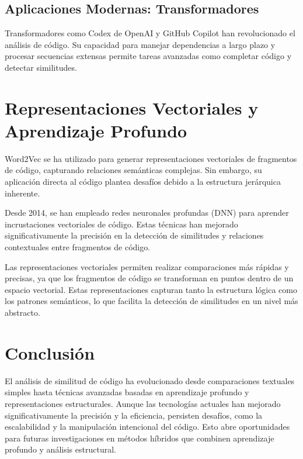 \subsection{Aplicaciones Modernas: Transformadores}
Transformadores como Codex de OpenAI y GitHub Copilot \cite{vaswani2017attention} han revolucionado el análisis de código. Su capacidad para manejar dependencias a largo plazo y procesar secuencias extensas permite tareas avanzadas como completar código y detectar similitudes.

\section{Representaciones Vectoriales y Aprendizaje Profundo}

Word2Vec se ha utilizado para generar representaciones vectoriales de fragmentos de código, capturando relaciones semánticas complejas. Sin embargo, su aplicación directa al código plantea desafíos debido a la estructura jerárquica inherente.

Desde 2014, se han empleado redes neuronales profundas (DNN) para aprender incrustaciones vectoriales de código. Estas técnicas han mejorado significativamente la precisión en la detección de similitudes y relaciones contextuales entre fragmentos de código.

Las representaciones vectoriales permiten realizar comparaciones más rápidas y precisas, ya que los fragmentos de código se transforman en puntos dentro de un espacio vectorial. Estas representaciones capturan tanto la estructura lógica como los patrones semánticos, lo que facilita la detección de similitudes en un nivel más abstracto.

\section{Conclusión}
El análisis de similitud de código ha evolucionado desde comparaciones textuales simples hasta técnicas avanzadas basadas en aprendizaje profundo y representaciones estructurales. Aunque las tecnologías actuales han mejorado significativamente la precisión y la eficiencia, persisten desafíos, como la escalabilidad y la manipulación intencional del código. Esto abre oportunidades para futuras investigaciones en métodos híbridos que combinen aprendizaje profundo y análisis estructural.
